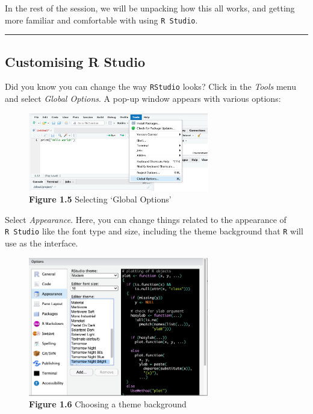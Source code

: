 \documentclass[
]{book}
\begin{document}
In the rest of the session, we will be unpacking how this all works, and getting more familiar and comfortable with using \texttt{R\ Studio}.

\begin{center}\rule{0.5\linewidth}{0.5pt}\end{center}

\hypertarget{customising-r-studio}{%
\subsection{Customising R Studio}\label{customising-r-studio}}

Did you know you can change the way \texttt{RStudio} looks? Click in the \emph{Tools} menu and select \emph{Global Options}. A pop-up window appears with various options:

\begin{figure}
\centering
\includegraphics[width=0.7\textwidth,height=\textheight]{Images/tools_global_options.png}
\caption{\textbf{Figure 1.5} Selecting `Global Options'}
\end{figure}

Select \emph{Appearance}. Here, you can change things related to the appearance of \texttt{R\ Studio} like the font type and size, including the theme background that \texttt{R} will use as the interface.

\begin{figure}
\centering
\includegraphics[width=0.7\textwidth,height=\textheight]{Images/appearance_choose_tomorrow_night_bright.png}
\caption{\textbf{Figure 1.6} Choosing a theme background}
\end{figure}
\end{document}
